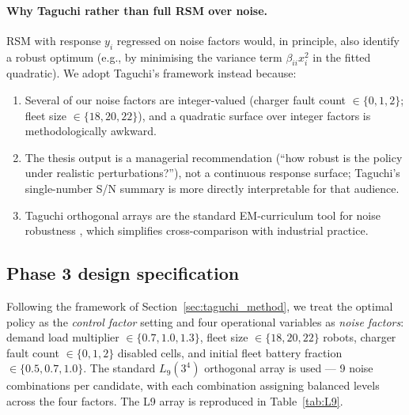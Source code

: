 \documentclass[conference]{IEEEtran}
\begin{document}
\paragraph{Why Taguchi rather than full RSM over noise.}
RSM with response $y_i$ regressed on noise factors would, in principle, also identify a robust optimum (e.g., by minimising the variance term $\beta_{ii} x_i^2$ in the fitted quadratic). We adopt Taguchi's framework instead because:
\begin{enumerate}
  \item Several of our noise factors are integer-valued (charger fault count $\in \{0,1,2\}$; fleet size $\in \{18,20,22\}$), and a quadratic surface over integer factors is methodologically awkward.
  \item The thesis output is a managerial recommendation (``how robust is the policy under realistic perturbations?''), not a continuous response surface; Taguchi's single-number S/N summary is more directly interpretable for that audience.
  \item Taguchi orthogonal arrays are the standard EM-curriculum tool for noise robustness \cite{ross1996,phadke1989}, which simplifies cross-comparison with industrial practice.
\end{enumerate}

\subsection{Phase 3 design specification}
Following the framework of Section~\ref{sec:taguchi_method}, we treat the optimal policy as the \emph{control factor} setting and four operational variables as \emph{noise factors}: demand load multiplier $\in \{0.7, 1.0, 1.3\}$, fleet size $\in \{18, 20, 22\}$ robots, charger fault count $\in \{0, 1, 2\}$ disabled cells, and initial fleet battery fraction $\in \{0.5, 0.7, 1.0\}$. The standard $L_9(3^4)$ orthogonal array is used --- 9 noise combinations per candidate, with each combination assigning balanced levels across the four factors. The L9 array is reproduced in Table~\ref{tab:L9}.
\end{document}
